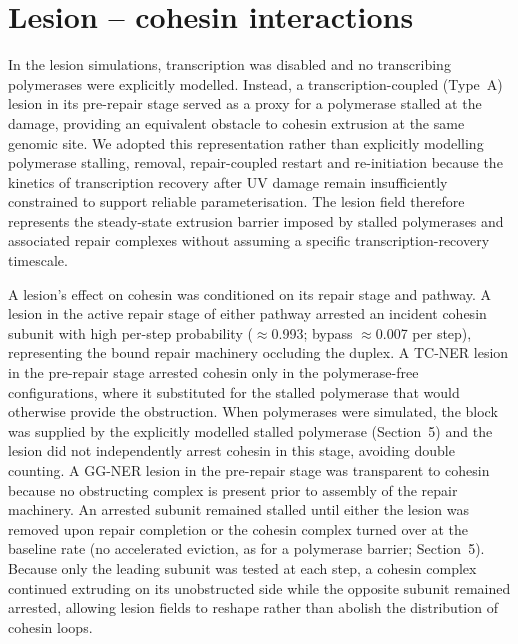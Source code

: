 \documentclass[11pt]{article}
\begin{document}
\section{Lesion -- cohesin interactions}

In the lesion simulations, transcription was disabled and no transcribing polymerases
were explicitly modelled. Instead, a transcription-coupled (Type~A) lesion in its
pre-repair stage served as a proxy for a polymerase stalled at the damage, providing
an equivalent obstacle to cohesin extrusion at the same genomic site. We adopted this
representation rather than explicitly modelling polymerase stalling, removal,
repair-coupled restart and re-initiation because the kinetics of transcription
recovery after UV damage remain insufficiently constrained to support reliable
parameterisation. The lesion field therefore represents the steady-state extrusion
barrier imposed by stalled polymerases and associated repair complexes without
assuming a specific transcription-recovery timescale.

A lesion's effect on cohesin was conditioned on its repair stage and pathway. A
lesion in the active repair stage of either pathway arrested an incident cohesin
subunit with high per-step probability ($\approx$0.993; bypass $\approx$0.007 per
step), representing the bound repair machinery occluding the duplex. A TC-NER lesion in
the pre-repair stage arrested cohesin only in the polymerase-free configurations, where
it substituted for the stalled polymerase that would otherwise provide the obstruction.
When polymerases were simulated, the block was supplied by the explicitly modelled
stalled polymerase (Section~5) and the lesion did not independently arrest cohesin in
this stage, avoiding double counting. A GG-NER lesion in the pre-repair stage was
transparent to cohesin because no obstructing complex is present prior to assembly of
the repair machinery. An arrested subunit remained stalled until either the lesion was
removed upon repair completion or the cohesin complex turned over at the baseline rate
(no accelerated eviction, as for a polymerase barrier; Section~5). Because only the
leading subunit was tested at each step, a cohesin complex continued extruding on its
unobstructed side while the opposite subunit remained arrested, allowing lesion fields
to reshape rather than abolish the distribution of cohesin loops.

\end{document}
